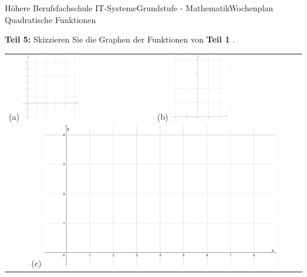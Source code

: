 \documentclass[oneside,openany,headings=optiontotoc,11pt,numbers=noenddot]{scrreprt}
\begin{document}
\begin{worksheet}{Höhere Berufsfachschule IT-Systeme}{Grundstufe - Mathematik}{Wochenplan Quadratische Funktionen}
		\newpage
		\begin{framed}
			\noindent
			\textbf{Teil 5:} Skizzieren Sie die Graphen der Funktionen von \textbf{Teil 1} .\\
			\begin{tabularx}{\textwidth}{XX}
				(a) \includegraphics[width=0.4\textwidth, align=t]{../99_Bilder/WP5DiA.jpg} & (b) \includegraphics[width=0.4\textwidth, align=t]{../99_Bilder/WP5DiB.jpg}\\
				\multicolumn{2}{c}{(c) \includegraphics[width=0.8\textwidth, align=t]{../99_Bilder/WP5DiC.jpg}}
			\end{tabularx}
		\end{framed}
	\end{worksheet}
\end{document}
